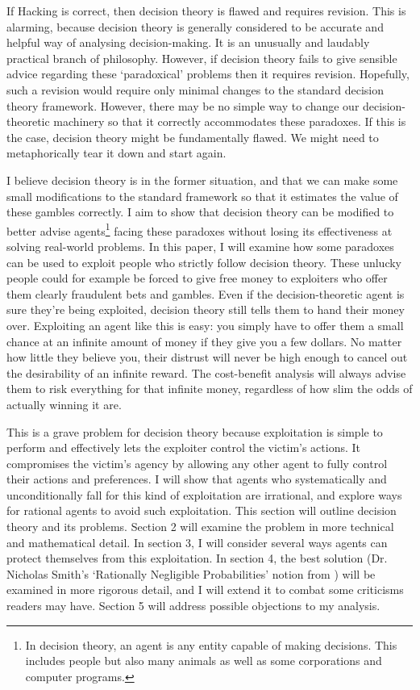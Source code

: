 \documentclass{article}
\begin{document}
If Hacking is correct, then decision theory is flawed and requires revision. This is alarming, because decision theory is generally considered to be accurate and helpful way of analysing decision-making. It is an unusually and laudably practical branch of philosophy. However, if decision theory fails to give sensible advice regarding these `paradoxical' problems then it requires revision. Hopefully, such a revision would require only minimal changes to the standard decision theory framework. However, there may be no simple way to change our decision-theoretic machinery so that it correctly accommodates these paradoxes. If this is the case, decision theory might be fundamentally flawed. We might need to metaphorically tear it down and start again. 

I believe decision theory is in the former situation, and that we can make some small modifications to the standard framework so that it estimates the value of these gambles correctly. I aim to show that decision theory can be modified to better advise agents\footnote{In decision theory, an agent is any entity capable of making decisions. This includes people but also many animals as well as some corporations and computer programs.} facing these paradoxes without losing its effectiveness at solving real-world problems. In this paper, I will examine how some paradoxes can be used to exploit people who strictly follow decision theory. These unlucky people could for example be forced to give free money to exploiters who offer them clearly fraudulent bets and gambles. Even if the decision-theoretic agent is sure they're being exploited, decision theory still tells them to hand their money over. Exploiting an agent like this is easy: you simply have to offer them a small chance at an infinite amount of money if they give you a few dollars. No matter how little they believe you, their distrust will never be high enough to cancel out the desirability of an infinite reward. The cost-benefit analysis will always advise them to risk everything for that infinite money, regardless of how slim the odds of actually winning it are.

This is a grave problem for decision theory because exploitation is simple to perform and effectively lets the exploiter control the victim's actions. It compromises the victim's agency by allowing any other agent to fully control their actions and preferences. I will show that agents who systematically and unconditionally fall for this kind of exploitation are irrational, and explore ways for rational agents to avoid such exploitation. This section will outline decision theory and its problems. Section 2 will examine the problem in more technical and mathematical detail. In section 3, I will consider several ways agents can protect themselves from this exploitation. In section 4, the best solution (Dr. Nicholas Smith's `Rationally Negligible Probabilities' notion from \citep{smith2014evaluative}) will be examined in more rigorous detail, and I will extend it to combat some criticisms readers may have. Section 5 will address possible objections to my analysis.
\end{document}
